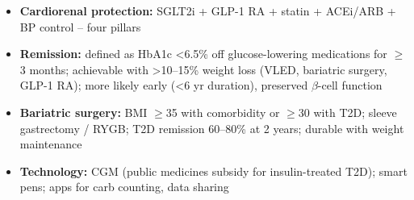 \begin{itemize}
\begin{itemize}
        \item \textbf{DPP-4 inhibitors (sitagliptin, linagliptin, saxagliptin, alogliptin):} weight neutral, low hypoglycaemia risk, modest efficacy (-0.5--0.7\%), no CV harm (saxagliptin/alogliptin: HF caution); oral; linagliptin no renal dose adjustment
        \item \textbf{Sulfonylureas (gliclazide MR, glimepiride, glipizide):} inexpensive, effective (-1.0--1.5\%), but hypoglycaemia risk, weight gain, no CV benefit, $\beta$-cell exhaustion; second/third line; avoid in elderly/CKD
        \item \textbf{Thiazolidinediones (pioglitazone):} insulin sensitiser, durable, weight gain, oedema, fracture risk, bladder cancer concern, HF contraindicated; niche use
        \item \textbf{Insulin:} basal (glargine U100/U300, degludec, detemir) when oral agents insufficient; add prandial rapid-acting if needed; start low (10 U or 0.1--0.2 U/kg), titrate; CGM for insulin-treated; biosimilars available
        \item \textbf{Combination:} early dual/triple therapy if HbA1c >9\% or >1.5\% above target; fixed-ratio combinations (GLP-1 + basal insulin: iGlarLixi, iDegLira)
    \end{itemize}
    \item \textbf{Cardiorenal protection:} SGLT2i + GLP-1 RA + statin + ACEi/ARB + BP control -- four pillars
    \item \textbf{Remission:} defined as HbA1c <6.5\% off glucose-lowering medications for $\ge$3 months; achievable with >10--15\% weight loss (VLED, bariatric surgery, GLP-1 RA); more likely early (<6 yr duration), preserved $\beta$-cell function
    \item \textbf{Bariatric surgery:} BMI $\ge$35 with comorbidity or $\ge$30 with T2D; sleeve gastrectomy / RYGB; T2D remission 60--80\% at 2 years; durable with weight maintenance
    \item \textbf{Technology:} CGM (public medicines subsidy for insulin-treated T2D); smart pens; apps for carb counting, data sharing
\end{itemize}

